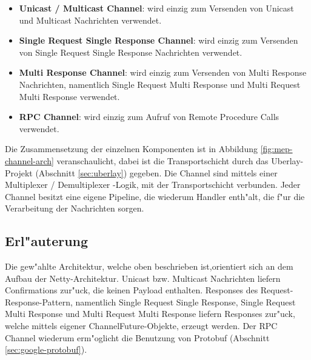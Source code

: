 \begin{itemize}
\item {\bf Unicast / Multicast Channel}: wird einzig zum Versenden von Unicast und Multicast Nachrichten verwendet.
\item {\bf Single Request Single Response Channel}: wird einzig zum Versenden von Single Request Single Response Nachrichten verwendet.
\item {\bf Multi Response Channel}: wird einzig zum Versenden von Multi Response Nachrichten, namentlich Single Request Multi Response und Multi Request Multi Response verwendet.
\item {\bf RPC Channel}: wird einzig zum Aufruf von Remote Procedure Calls verwendet.
\end{itemize}


Die Zusammensetzung der einzelnen Komponenten ist in Abbildung \ref{fig:mep-channel-arch} veranschaulicht, dabei ist die Transportschicht durch das Uberlay-Projekt (Abschnitt \ref{sec:uberlay}) gegeben. Die Channel sind mittels einer Multiplexer / Demultiplexer -Logik, mit der Transportschicht verbunden. Jeder Channel besitzt eine eigene Pipeline, die wiederum Handler enth"alt, die f"ur die Verarbeitung der Nachrichten sorgen. 

\subsection{Erl"auterung}
Die gew"ahlte Architektur, welche oben beschrieben ist,orientiert sich an dem Aufbau der Netty-Architektur. Unicast bzw. Multicast Nachrichten liefern Confirmations zur"uck, die keinen Payload enthalten. Responses des Request-Response-Pattern, namentlich Single Request Single Response, Single Request Multi Response und Multi Request Multi Response liefern Responses zur"uck, welche mittels eigener ChannelFuture-Objekte, erzeugt werden. Der RPC Channel wiederum erm"oglicht die Benutzung von Protobuf (Abschnitt \ref{sec:google-protobuf}).

